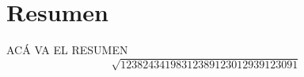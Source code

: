 \chapter*{Resumen}
\noindent ACÁ VA EL RESUMEN
\begin{equation}
    \sqrt{12382434198312389123012939123091}
\end{equation}